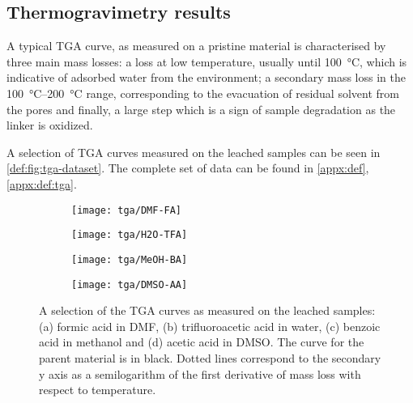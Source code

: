 
\subsection{Thermogravimetry results}

A typical TGA curve, as measured on a pristine material
is characterised by three main mass losses: a loss
at low temperature, usually until \SI{100}{\degreeCelsius},
which is indicative of adsorbed water from the environment;
a secondary mass loss in the \SIrange{100}{200}{\degreeCelsius}
range, corresponding to the evacuation of residual solvent 
from the pores and finally, a large step which is a sign of 
sample degradation as the linker is oxidized.

A selection of TGA curves measured on the leached samples
can be seen in \autoref{def:fig:tga-dataset}. The complete set of data
can be found in \autoref{appx:def}, \autoref{appx:def:tga}.

\begin{figure}[htbp]
    \centering

    \begin{subfigure}{0.5\linewidth}
        \texttt{[image: tga/DMF-FA]}%
		\caption{}%
        \label{def:fig:tga-dmf-fa}
    \end{subfigure}%
    \begin{subfigure}{0.5\linewidth}
        \texttt{[image: tga/H2O-TFA]}%
		\caption{}%
        \label{def:fig:tga-h2o-tfa}
    \end{subfigure}%

    
    \begin{subfigure}{0.5\linewidth}
        \texttt{[image: tga/MeOH-BA]}%
		\caption{}%
        \label{def:fig:tga-meoh-ba}
    \end{subfigure}%
    \begin{subfigure}{0.5\linewidth}
        \texttt{[image: tga/DMSO-AA]}%
		\caption{}%
        \label{def:fig:tga-dmso-aa}
    \end{subfigure}%

    \caption{A selection of the TGA curves as measured on the
    leached samples: (a) formic acid in DMF, (b) trifluoroacetic
    acid in water, (c) benzoic acid in methanol and (d) acetic acid
    in DMSO. The curve for the parent material is in black. 
    Dotted lines correspond to the secondary y axis as a 
    semilogarithm of the first derivative of mass loss with 
    respect to temperature.}%
    \label{def:fig:tga-dataset}
\end{figure}

